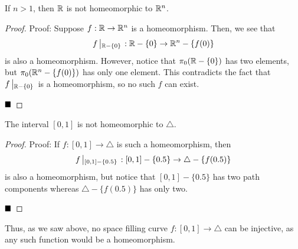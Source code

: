 \begin{lemma}
    If $n > 1$, then $\mathbb{R}$ is not homeomorphic to $\mathbb{R}^n$.
\end{lemma}
\begin{proof}{Proof:}
    Suppose $f : \mathbb{R} \to \mathbb{R}^n$ is a homeomorphism. Then, we see that
    \[ f\left|_{\mathbb{R} - \{0\}}\right. : \mathbb{R} - \{0\} \to \mathbb{R}^n - \{f(0)\} \]
    is also a homeomorphism. However, notice that $\pi_0(\mathbb{R} - \{0\})$ has two elements, but $\pi_0(\mathbb{R}^n - \{f(0)\})$ has only one element. This contradicts the fact that $f \left|_{\mathbb{R} - \{0\}}\right.$ is a homeomorphism, so no such $f$ can exist.

    $\qed$
\end{proof}

\begin{lemma}
    The interval $[0, 1]$ is not homeomorphic to $\triangle$. 
\end{lemma}
\begin{proof}{Proof:}
    If $f : [0, 1] \to \triangle$ is such a homeomorphism, then
    \[ f \left|_{[0, 1] - \{0.5\}}\right. : [0, 1] - \{0.5\} \to \triangle - \{f(0.5)\} \]
    is also a homeomorphism, but notice that $[0, 1] - \{0.5\}$ has two path components whereas $\triangle - \{f(0.5)\}$ has only two. 

    $\qed$
\end{proof}

Thus, as we saw above, no space filling curve $f : [0, 1] \to \triangle$ can be injective, as any such function would be a homeomorphism.
